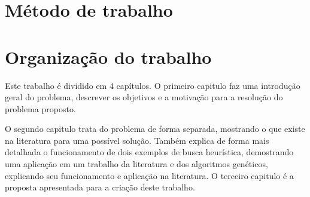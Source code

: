 \section{Método de trabalho}

 

\section{Organização do trabalho}
Este trabalho é dividido em 4 capítulos. O primeiro capitulo faz uma introdução geral do problema, descrever os objetivos e a motivação para a resolução do problema proposto.

O segundo capitulo trata do problema de forma separada, mostrando o que existe na literatura para uma possível solução. Também explica de forma mais detalhada o funcionamento de dois exemplos de busca heurística, demostrando uma aplicação em um trabalho da literatura e dos algoritmos genéticos, explicando seu funcionamento e aplicação na literatura.
O terceiro capitulo é a proposta apresentada para a criação deste trabalho.

